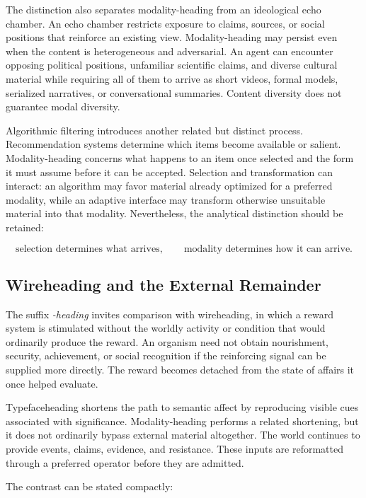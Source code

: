 \documentclass[11pt]{article}
\newcommand{\term}[1]{\emph{#1}}
\begin{document}
The distinction also separates modality-heading from an ideological echo
chamber. An echo chamber restricts exposure to claims, sources, or social
positions that reinforce an existing view. Modality-heading may persist even
when the content is heterogeneous and adversarial. An agent can encounter
opposing political positions, unfamiliar scientific claims, and diverse
cultural material while requiring all of them to arrive as short videos,
formal models, serialized narratives, or conversational summaries. Content
diversity does not guarantee modal diversity.

Algorithmic filtering introduces another related but distinct process.
Recommendation systems determine which items become available or salient.
Modality-heading concerns what happens to an item once selected and the form
it must assume before it can be accepted. Selection and transformation can
interact: an algorithm may favor material already optimized for a preferred
modality, while an adaptive interface may transform otherwise unsuitable
material into that modality. Nevertheless, the analytical distinction should
be retained:

\begin{equation}
  \text{selection determines what arrives},
  \qquad
  \text{modality determines how it can arrive}.
  \label{eq:selection-transformation}
\end{equation}

\subsection{Wireheading and the External Remainder}

The suffix \term{-heading} invites comparison with wireheading, in which a
reward system is stimulated without the worldly activity or condition that
would ordinarily produce the reward. An organism need not obtain nourishment,
security, achievement, or social recognition if the reinforcing signal can
be supplied more directly. The reward becomes detached from the state of
affairs it once helped evaluate.

Typefaceheading shortens the path to semantic affect by reproducing visible
cues associated with significance. Modality-heading performs a related
shortening, but it does not ordinarily bypass external material altogether.
The world continues to provide events, claims, evidence, and resistance.
These inputs are reformatted through a preferred operator before they are
admitted.

The contrast can be stated compactly:
\end{document}
